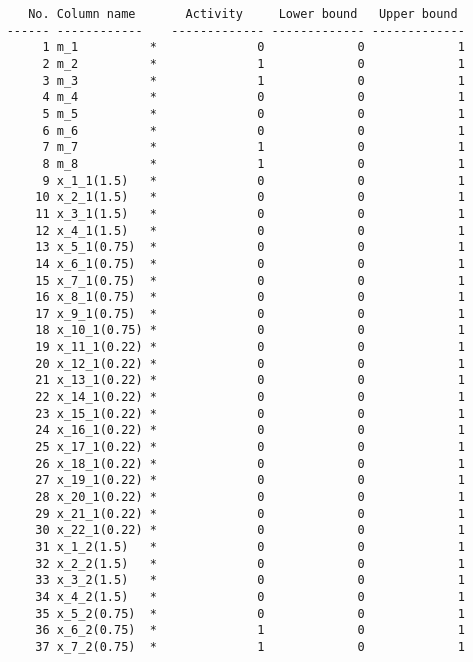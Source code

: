 \documentclass{article}[A4]
\begin{document}
\begin{verbatim}
	   No. Column name       Activity     Lower bound   Upper bound
	------ ------------    ------------- ------------- -------------
	     1 m_1          *              0             0             1 
	     2 m_2          *              1             0             1 
	     3 m_3          *              1             0             1 
	     4 m_4          *              0             0             1 
	     5 m_5          *              0             0             1 
	     6 m_6          *              0             0             1 
	     7 m_7          *              1             0             1 
	     8 m_8          *              1             0             1 
	     9 x_1_1(1.5)   *              0             0             1 
	    10 x_2_1(1.5)   *              0             0             1 
	    11 x_3_1(1.5)   *              0             0             1 
	    12 x_4_1(1.5)   *              0             0             1 
	    13 x_5_1(0.75)  *              0             0             1 
	    14 x_6_1(0.75)  *              0             0             1 
	    15 x_7_1(0.75)  *              0             0             1 
	    16 x_8_1(0.75)  *              0             0             1 
	    17 x_9_1(0.75)  *              0             0             1 
	    18 x_10_1(0.75) *              0             0             1 
	    19 x_11_1(0.22) *              0             0             1 
	    20 x_12_1(0.22) *              0             0             1 
	    21 x_13_1(0.22) *              0             0             1 
	    22 x_14_1(0.22) *              0             0             1 
	    23 x_15_1(0.22) *              0             0             1 
	    24 x_16_1(0.22) *              0             0             1 
	    25 x_17_1(0.22) *              0             0             1 
	    26 x_18_1(0.22) *              0             0             1 
	    27 x_19_1(0.22) *              0             0             1 
	    28 x_20_1(0.22) *              0             0             1 
	    29 x_21_1(0.22) *              0             0             1 
	    30 x_22_1(0.22) *              0             0             1 
	    31 x_1_2(1.5)   *              0             0             1 
	    32 x_2_2(1.5)   *              0             0             1 
	    33 x_3_2(1.5)   *              0             0             1 
	    34 x_4_2(1.5)   *              0             0             1 
	    35 x_5_2(0.75)  *              0             0             1 
	    36 x_6_2(0.75)  *              1             0             1 
	    37 x_7_2(0.75)  *              1             0             1 

\end{verbatim}
\end{document}
